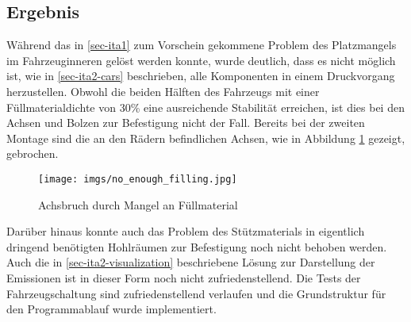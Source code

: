 \documentclass[.../Dokumentation.tex]{subfiles}
\begin{document}
\subsection{Ergebnis}\label{sec-ita2-result}
Während das in \ref{sec-ita1} zum Vorschein gekommene Problem des 
Platzmangels im Fahrzeuginneren gelöst werden konnte, wurde deutlich, 
dass es nicht möglich ist, wie in \ref{sec-ita2-cars} beschrieben, 
alle Komponenten in einem Druckvorgang herzustellen. 
Obwohl die beiden Hälften des Fahrzeugs mit einer Füllmaterialdichte von 
30\% eine ausreichende Stabilität erreichen, ist dies bei den Achsen und 
Bolzen zur Befestigung nicht der Fall. Bereits bei der zweiten Montage sind 
die an den Rädern befindlichen Achsen, wie in Abbildung 
\ref{fig-not-enough-filling} gezeigt, gebrochen. 
\begin{figure}[H]
\begin{center}
    \texttt{[image: imgs/no\_enough\_filling.jpg]}
    \caption{Achsbruch durch Mangel an Füllmaterial}
    \label{fig-not-enough-filling}
\end{center}
\end{figure}
\noindent
Darüber hinaus konnte auch das Problem des Stützmaterials in eigentlich 
dringend benötigten Hohlräumen zur Befestigung noch nicht behoben werden.
Auch die in \ref{sec-ita2-visualization} beschriebene Lösung zur 
Darstellung der Emissionen ist in dieser Form noch nicht zufriedenstellend. Die Tests der Fahrzeugschaltung sind zufriedenstellend verlaufen und die Grundstruktur für den Programmablauf wurde implementiert.
\end{document}
